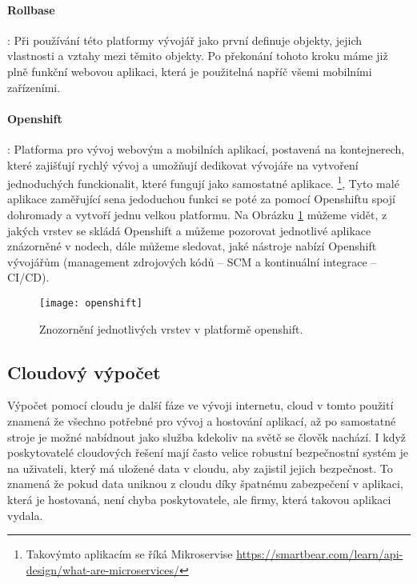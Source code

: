 \paragraph{Rollbase}: Při používání této platformy vývojář jako první definuje objekty, jejich vlastnosti a vztahy mezi těmito objekty. Po překonání tohoto kroku máme již plně funkční webovou aplikaci, která je použitelná napříč všemi mobilními zařízeními. \cite{what-is-low-code}
\paragraph{Openshift}: Platforma pro vývoj webovým a mobilních aplikací, postavená na kontejnerech, které zajišťují rychlý vývoj a umožňují dedikovat vývojáře na vytvoření jednoduchých funckionalit, které fungují jako samostatné aplikace. \footnote{Takovýmto aplikacím se říká Mikroservise \url{https://smartbear.com/learn/api-design/what-are-microservices/}}, Tyto malé aplikace zaměřující sena jedoduchou funkci se poté za pomocí Openshiftu spojí dohromady a vytvoří jednu velkou platformu. Na Obrázku \ref{openshift-vrstvy} můžeme vidět, z jakých vrstev se skládá Openshift a můžeme pozorovat jednotlivé aplikace znázorněné v nodech, dále můžeme sledovat, jaké nástroje nabízí Openshift vývojářům (management zdrojových kódů -- SCM a kontinuální integrace -- CI/CD).\cite{openshift-overview}
\begin{figure}[h]
\centering
\texttt{[image: openshift]}
\caption{Znozornění jednotlivých vrstev v platformě openshift.}
\label{openshift-vrstvy}
\end{figure}

\subsection{Cloudový výpočet}
\par Výpočet pomocí cloudu je další fáze ve vývoji internetu, cloud v tomto použití znamená že všechno potřebné pro vývoj a hostování aplikací, až po samostatné stroje je možné nabídnout jako služba kdekoliv na světě se člověk nachází. I když poskytovatelé cloudových řešení mají často velice robustní bezpečnostní systém je na uživateli, který má uložené data v cloudu, aby zajistil jejich bezpečnost. To znamená že pokud data uniknou z cloudu díky špatnému zabezpečení v aplikaci, která je hostovaná, není chyba poskytovatele, ale firmy, která takovou aplikaci vydala.\cite{cloud-computing-dummies}

